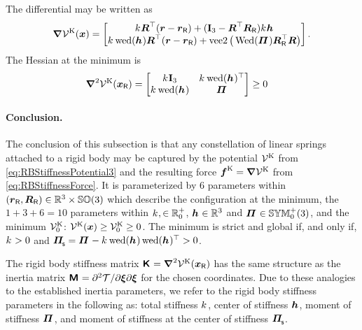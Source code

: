 The differential may be written as
\begin{align}\label{eq:RBStiffnessForce}
 \differential\potentialStiff(\sysCoord) = \begin{bmatrix} \bodyStiffness{}{} \R^\top (\r - \rR) + (\idMat[3] - \R^\top\RR) \bodyStiffness{}{}\bodyCOS{}{} \\ \bodyStiffness{}{}\wedOp(\bodyCOS{}{}) \R^\top (\r-\rR) + \veeTwoOp\big(\wedMatOp(\bodyMOS{}{}) \RR^\top\R\big) \end{bmatrix}.
\end{align}
The Hessian at the minimum is
\begin{align} 
 \differential^2\potentialStiff(\sysCoordR) &= \begin{bmatrix} \bodyStiffness{}{}\idMat[3] & \bodyStiffness{}{} \wedOp(\bodyCOS{}{})^\top \\ \bodyStiffness{}{}\wedOp(\bodyCOS{}{}) & \bodyMOS{}{} \end{bmatrix} \geq 0
\end{align}


\paragraph{Conclusion.}
The conclusion of this subsection is that any constellation of linear springs attached to a rigid body may be captured by the potential $\mathcal{V}^{\mathrm{K}}$ from \eqref{eq:RBStiffnessPotential3} and the resulting force $\boldsymbol{f}^{\mathrm{K}} = \boldsymbol{\nabla}\mathcal{V}^{\mathrm{K}}$ from \eqref{eq:RBStiffnessForce}.
It is parameterized by 6 parameters within $(\boldsymbol{r}_{\mathsf{R}},\boldsymbol{R}_{\mathsf{R}}) \in \mathbb{R}^3 \times \mathbb{SO}(3)$ which describe the configuration at the minimum, the $1+3+6=10$ parameters within $\bodyStiffness{}{}, \in\RealNum^+_0$, $\bodyCOS{}{} \in \RealNum^3$ and $\bodyMOS{}{} \in \SymMatSP(3)$, and the minimum $\mathcal{V}^{\mathrm{K}}_0$: $\mathcal{V}^{\mathrm{K}}(\boldsymbol{x}) \geq \mathcal{V}^{\mathrm{K}}_0 \geq 0$.
The minimum is strict and global if, and only if, $\bodyStiffness{}{} > 0$ and $\bodyMOSs{}{} = \bodyMOS{}{} - \bodyStiffness{}{} \wedOp(\bodyCOS{}{}) \wedOp(\bodyCOS{}{})^\top > 0$.

The rigid body stiffness matrix $\bodyStiffMat{}{} = \differential^2\potentialStiff(\sysCoordR)$ has the same structure as the inertia matrix $\bodyInertiaMat{}{} = \sfrac{\partial^2 \kineticEnergy}{\partial \sysVel \partial \sysVel}$ for the chosen coordinates.
Due to these analogies to the established inertia parameters, we refer to the rigid body stiffness parameters in the following as: total stiffness $\bodyStiffness{}{}$, center of stiffness $\bodyCOS{}{}$, moment of stiffness $\bodyMOS{}{}$, and moment of stiffness at the center of stiffness $\bodyMOSs{}{}$.

